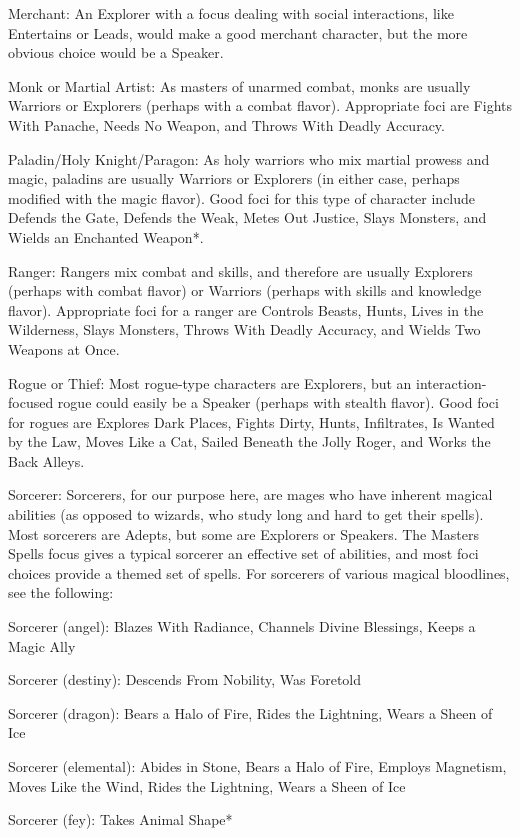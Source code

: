 Merchant: An Explorer with a focus dealing with social interactions, like Entertains or Leads, would make a good merchant character, but the more obvious choice would be a Speaker.

Monk or Martial Artist: As masters of unarmed combat, monks are usually Warriors or Explorers (perhaps with a combat flavor). Appropriate foci are Fights With Panache, Needs No Weapon, and Throws With Deadly Accuracy. 

Paladin/Holy Knight/Paragon: As holy warriors who mix martial prowess and magic, paladins are usually Warriors or Explorers (in either case, perhaps modified with the magic flavor). Good foci for this type of character include Defends the Gate, Defends the Weak, Metes Out Justice, Slays Monsters, and Wields an Enchanted Weapon*.

Ranger: Rangers mix combat and skills, and therefore are usually Explorers (perhaps with combat flavor) or Warriors (perhaps with skills and knowledge flavor). Appropriate foci for a ranger are Controls Beasts, Hunts, Lives in the Wilderness, Slays Monsters, Throws With Deadly Accuracy, and Wields Two Weapons at Once. 

Rogue or Thief: Most rogue-type characters are Explorers, but an interaction-focused rogue could easily be a Speaker (perhaps with stealth flavor). Good foci for rogues are Explores Dark Places, Fights Dirty, Hunts, Infiltrates, Is Wanted by the Law, Moves Like a Cat, Sailed Beneath the Jolly Roger, and Works the Back Alleys. 

Sorcerer: Sorcerers, for our purpose here, are mages who have inherent magical abilities (as opposed to wizards, who study long and hard to get their spells). Most sorcerers are Adepts, but some are Explorers or Speakers. The Masters Spells focus gives a typical sorcerer an effective set of abilities, and most foci choices provide a themed set of spells. For sorcerers of various magical bloodlines, see the following: 

Sorcerer (angel): Blazes With Radiance, Channels Divine Blessings, Keeps a Magic Ally 

Sorcerer (destiny): Descends From Nobility, Was Foretold

Sorcerer (dragon): Bears a Halo of Fire, Rides the Lightning, Wears a Sheen of Ice

Sorcerer (elemental): Abides in Stone, Bears a Halo of Fire, Employs Magnetism, Moves Like the Wind, Rides the Lightning, Wears a Sheen of Ice 

Sorcerer (fey): Takes Animal Shape* 

